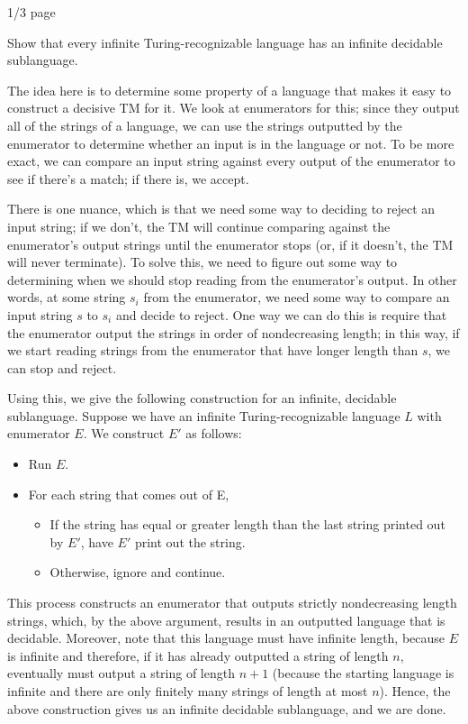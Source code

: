 \documentclass[solution, letterpaper]{cs121}
\begin{document}
 {1/3 page}

\noindent Show that every infinite Turing-recognizable language
has an infinite decidable sublanguage.

\begin{solution}
\indent The idea here is to determine some property of a language that makes it easy to construct a decisive TM for it.  We look at enumerators for this; since they output all of the strings of a language, we can use the strings outputted by the enumerator to determine whether an input is in the language or not.  To be more exact, we can compare an input string against every output of the enumerator to see if there's a match; if there is, we accept.  

There is one nuance, which is that we need some way to deciding to reject an input string; if we don't, the TM will continue comparing against the enumerator's output strings until the enumerator stops (or, if it doesn't, the TM will never terminate).  To solve this, we need to figure out some way to determining when we should stop reading from the enumerator's output.  In other words, at some string $s_i$ from the enumerator, we need some way to compare an input string $s$ to $s_i$ and decide to reject.  One way we can do this is require that the enumerator output the strings in order of nondecreasing length; in this way, if we start reading strings from the enumerator that have longer length than $s$, we can stop and reject.

Using this, we give the following construction for an infinite, decidable sublanguage.  Suppose we have an infinite Turing-recognizable language $L$ with enumerator $E$.  We construct $E'$ as follows:
\begin{itemize}
	\setlength\itemsep{0cm}
	\item Run $E$.
	\item For each string that comes out of E,
	\begin{itemize}
		\item If the string has equal or greater length than the last string printed out by $E'$, have $E'$ print out the string.
		\item Otherwise, ignore and continue.
	\end{itemize}
\end{itemize}

This process constructs an enumerator that outputs strictly nondecreasing length strings, which, by the above argument, results in an outputted language that is decidable.  Moreover, note that this language must have infinite length, because $E$ is infinite and therefore, if it has already outputted a string of length $n$, eventually must output a string of length $n+1$ (because the starting language is infinite and there are only finitely many strings of length at most $n$).  Hence, the above construction gives us an infinite decidable sublanguage, and we are done.
\end{solution}
\end{document}
